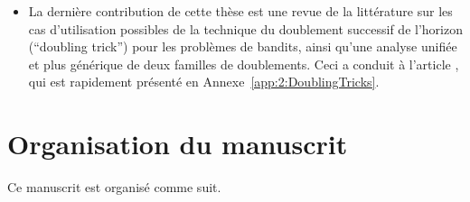 \begin{resume_fr}
\begin{itemize}
    \item
    La dernière contribution de cette thèse est une revue de la littérature sur les cas d'utilisation possibles de la technique du doublement successif de l'horizon (``doubling trick'') pour les problèmes de bandits,
    ainsi qu'une analyse unifiée et plus générique de deux familles de doublements.
    Ceci a conduit à l'article \cite{Besson2018DoublingTricks}, qui est rapidement présenté en Annexe~\ref{app:2:DoublingTricks}.
\end{itemize}

\section*{Organisation du manuscrit}

Ce manuscrit est organisé comme suit.


\end{resume_fr}
